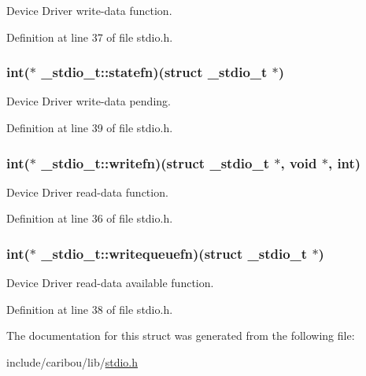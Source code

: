 Device Driver write-\/data function. 



Definition at line 37 of file stdio.\-h.

\hypertarget{struct__stdio__t_ac2642f9c5da1a64df85c6d67783a75e2}{
\subsubsection[{statefn}]{\setlength{\rightskip}{0pt plus 5cm}int($\ast$ \-\_\-stdio\-\_\-t\-::statefn)(struct {\bf \-\_\-stdio\-\_\-t} $\ast$)}}\label{struct__stdio__t_ac2642f9c5da1a64df85c6d67783a75e2}


Device Driver write-\/data pending. 



Definition at line 39 of file stdio.\-h.

\hypertarget{struct__stdio__t_aa50ed1df960be87cd28e05a1df7e9ddd}{
\subsubsection[{writefn}]{\setlength{\rightskip}{0pt plus 5cm}int($\ast$ \-\_\-stdio\-\_\-t\-::writefn)(struct {\bf \-\_\-stdio\-\_\-t} $\ast$, void $\ast$, int)}}\label{struct__stdio__t_aa50ed1df960be87cd28e05a1df7e9ddd}


Device Driver read-\/data function. 



Definition at line 36 of file stdio.\-h.

\hypertarget{struct__stdio__t_ae78e9d8689c33c835ac7551504937851}{
\subsubsection[{writequeuefn}]{\setlength{\rightskip}{0pt plus 5cm}int($\ast$ \-\_\-stdio\-\_\-t\-::writequeuefn)(struct {\bf \-\_\-stdio\-\_\-t} $\ast$)}}\label{struct__stdio__t_ae78e9d8689c33c835ac7551504937851}


Device Driver read-\/data available function. 



Definition at line 38 of file stdio.\-h.



The documentation for this struct was generated from the following file\-:\begin{DoxyCompactItemize}
\item 
include/caribou/lib/\hyperlink{stdio_8h}{stdio.\-h}\end{DoxyCompactItemize}
